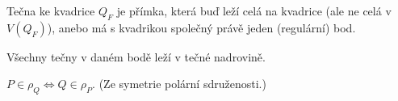 \documentclass[12pt]{article}					%
\begin{document}
\begin{definice}[Tečna]
	Tečna ke kvadrice $Q_F$ je přímka, která buď leží celá na kvadrice (ale ne celá v $V(Q_F)$), anebo má s kvadrikou společný právě jeden (regulární) bod.
\end{definice}

\begin{poznamka}
	Všechny tečny v daném bodě leží v tečné nadrovině.
\end{poznamka}

\begin{poznamka}[Platí]
	$P \in ρ_Q \Leftrightarrow Q \in ρ_P$. (Ze symetrie polární sdruženosti.)
\end{poznamka}
\end{document}
